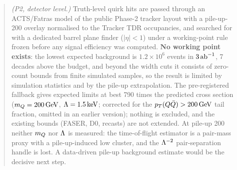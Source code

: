 \begin{abstract}
\emph{(P2, detector level.)} Truth-level quirk hits are passed through an ACTS/Fatras model of the public Phase-2 tracker layout
with a pile-up-200 overlay normalised to the Tracker TDR occupancies, and searched for with a dedicated barrel plane
finder ($|\eta|<1$) under a working-point rule frozen before any signal efficiency was computed.
\textbf{No working point exists}: the lowest expected background is $1.2\times10^6$ events in $3\abinv$, 7 decades above the
budget, and beyond the width cuts it consists of zero-count bounds from finite simulated samples, so the result is limited
by simulation statistics and by the pile-up extrapolation. The pre-registered fallback gives expected limits at best 790
times the predicted cross section ($\mQ=200\GeV$, $\Lam=1.5\keV$; corrected for the $p_T(Q\bar Q)>200\GeV$ tail fraction,
omitted in an earlier version); nothing is excluded, and the existing bounds (FASER, D0,
recasts) are not extended. At pile-up 200 neither $\mQ$ nor $\Lam$ is measured: the time-of-flight estimator is a pair-mass
proxy with a pile-up-induced low cluster, and the $\Lam^{-2}$ pair-separation handle is lost. A data-driven pile-up
background estimate would be the decisive next step.
\end{abstract}

